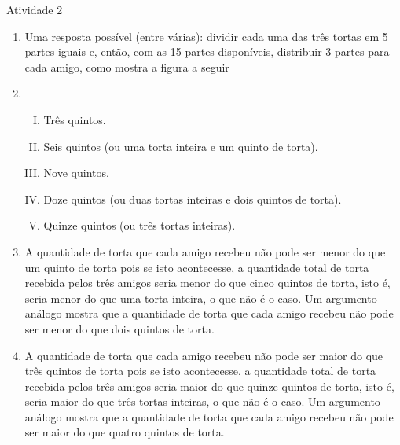 \documentclass[oneside]{book}
\begin{document}
\begin{multicols}{2}
\begin{resposta*}{Atividade 2}
\begin{enumerate} [\quad a)] %
    \item       Uma resposta possível (entre várias): dividir cada uma das três tortas em 5 partes iguais e, então, com as 15 partes disponíveis, distribuir 3 partes para cada amigo, como mostra a figura a seguir      
\begin{center}    
\end{center}
    \item
\begin{enumerate}[I)]
          \item Três quintos.
          \item Seis quintos (ou uma torta inteira e um quinto de torta).
          \item Nove quintos.
          \item Doze quintos (ou duas tortas inteiras e dois quintos de torta).
          \item Quinze quintos (ou três tortas inteiras).
\end{enumerate}

    \item       A quantidade de torta que cada amigo recebeu não pode ser menor do que um quinto de torta pois se isto acontecesse, a quantidade total de torta recebida pelos três amigos seria menor do que cinco quintos de torta, isto é, seria menor do que uma torta inteira, o que não é o caso. Um argumento análogo mostra que a quantidade de torta que cada amigo recebeu não pode ser menor do que dois quintos de torta.
    \item       A quantidade de torta que cada amigo recebeu não pode ser maior do que três quintos de torta pois se isto acontecesse, a quantidade total de torta recebida pelos três amigos seria maior do que quinze quintos de torta, isto é, seria maior do que três tortas inteiras, o que não é o caso. Um argumento análogo mostra que a quantidade de torta que cada amigo recebeu não pode ser maior do que quatro quintos de torta.
\end{enumerate} %



\end{resposta*}
\end{multicols}
\end{document}
